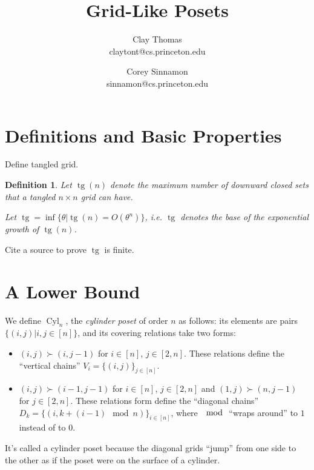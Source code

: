 \documentclass[12pt]{article}
\newtheorem{definition}[theorem]{Definition}
\DeclareMathOperator{\tg}{tg}
\DeclareMathOperator{\Cyl}{Cyl}
\newcommand{\1}[1]{\mathds{1}[{#1}]}
\begin{document}
\title{
  Grid-Like Posets
}
\author{
  Clay Thomas \\
  claytont@cs.princeton.edu
\and
  Corey Sinnamon \\
  sinnamon@cs.princeton.edu
}

\maketitle

\section{Definitions and Basic Properties}

Define tangled grid.

\begin{definition}
  Let $\tg(n)$ denote the maximum number of downward closed sets that a tangled
  $n\times n$ grid can have.

  Let $\tg = \inf \{ \theta | \tg(n) = O( \theta^n ) \}$, i.e. $\tg$ denotes the
  base of the exponential growth of $\tg(n)$.
\end{definition}

Cite a source to prove $\tg$ is finite.

\section{A Lower Bound}

We define $\Cyl_n$, the \emph{cylinder poset} of order $n$ as follows:
its elements are pairs $\{(i,j) | i,j\in[n] \}$, and
its covering relations take two forms: 
\begin{itemize}
  \item $(i, j) \succ (i, j-1)$ for $i\in[n]$, $j\in[2,n]$. These relations
    define the ``vertical chains'' $V_i = \{ (i,j) \}_{j\in[n]}$.
  \item $(i, j) \succ (i-1, j-1)$ for $i\in[n]$, $j\in[2,n]$ and
    $(1,j) \succ (n,j-1)$ for $j\in[2,n]$. These relations form define the 
    ``diagonal chains'' $D_k = \{ (i, k + (i-1) \mod n) \}_{i\in[n]}$, where
    $\mod$ ``wraps around'' to $1$ instead of to $0$.
\end{itemize}
It's called a cylinder poset because the diagonal grids ``jump'' from one side
to the other as if the poset were on the surface of a cylinder.
\end{document}
